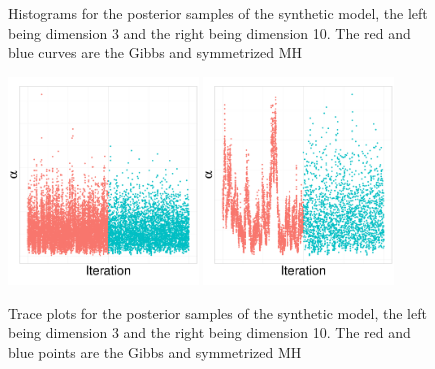 {\begin{figure}[H]
\begin{minipage}[!hp]{0.99\linewidth}
  \end{minipage}
    \caption{Histograms for the posterior samples of the synthetic model, the left being dimension 3 and the right being dimension 10. The red and blue curves are the Gibbs and symmetrized MH}
     \label{fig:HIST_EXP}
  \end{figure}

  \begin{figure}[H]
  \centering
  \begin{minipage}[!hp]{0.99\linewidth}
  \centering
  \begin{minipage}[!hp]{0.99\linewidth}
    \includegraphics [width=0.45\textwidth, angle=0]{figs/EXP_ks/exp_trace_7_05_3_.pdf}
    \includegraphics [width=0.45\textwidth, angle=0]{figs/EXP_ks/exp_trace_44_05_10_.pdf}
  \end{minipage}

  \end{minipage}
    \caption{Trace plots for the posterior samples of the synthetic model, the left being dimension 3 and the right being dimension 10. The red and blue points are the Gibbs and symmetrized MH}
     \label{fig:TRACE_EXP}
  \end{figure}

}
